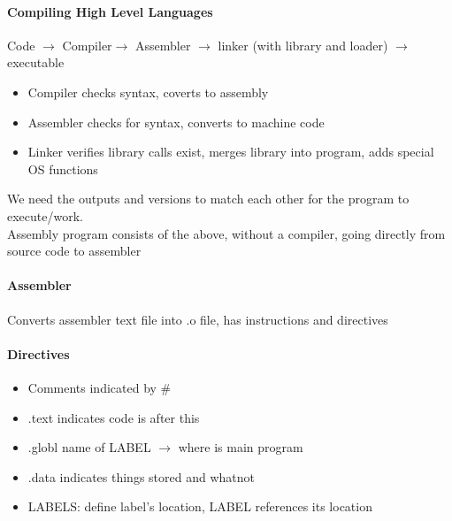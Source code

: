 \documentclass[12 pt]{article}
\begin{document}
\paragraph{Compiling High Level Languages} Code $\to$ Compiler$\to$ Assembler $\to$ linker (with library and loader) $\to$ executable
\begin{itemize}
\item Compiler checks syntax, coverts to assembly
\item Assembler checks for syntax, converts to machine code
\item Linker verifies library calls exist, merges library into program, adds special OS functions 
\end{itemize}
We need the outputs and versions to match each other for the program to execute/work.
\\ Assembly program consists of the above, without a compiler, going directly from source code to assembler
\paragraph{Assembler} Converts assembler text file into .o file, has instructions and directives
\paragraph{Directives}
\begin{itemize}
		\item Comments indicated by \#
		\item .text indicates code is after this
		\item .globl name of LABEL $\to$ where is main program
		\item .data indicates things stored and whatnot
		\item LABELS: define label's location, LABEL references its location
		\end{itemize}
\end{document}
